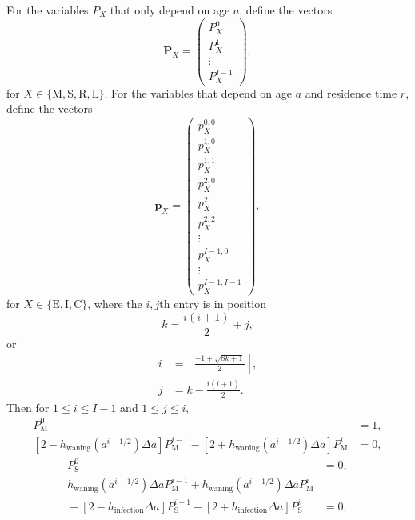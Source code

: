 \documentclass[12pt]{article}
\renewcommand{\vec}[1]{\mathbf{#1}}
\begin{document}
For the variables $P_X$ that only depend on age $a$,
define the vectors
\begin{equation}
  \vec{P}_X =
  \begin{pmatrix}
    P_X^0\\
    P_X^1\\
    \vdots\\
    P_X^{I - 1}
  \end{pmatrix},
\end{equation}
for $X \in \{\mathrm{M}, \mathrm{S}, \mathrm{R}, \mathrm{L}\}$.
For the variables that depend on age $a$ and residence time $r$,
define the vectors
\begin{equation}
  \vec{p}_X =
  \begin{pmatrix}
    p_X^{0, 0}\\
    p_X^{1, 0}\\
    p_X^{1, 1}\\
    p_X^{2, 0}\\
    p_X^{2, 1}\\
    p_X^{2, 2}\\
    \vdots\\
    p_X^{I - 1, 0}\\
    \vdots\\
    p_X^{I - 1, I - 1}
  \end{pmatrix},
\end{equation}
for $X \in \{\mathrm{E}, \mathrm{I}, \mathrm{C}\}$,
where the $i, j$th entry is in position
\begin{equation}
  k = \frac{i (i + 1)}{2} + j,
\end{equation}
or
\begin{equation}
  \begin{split}
    i &= \left\lfloor\frac{- 1 + \sqrt{8 k + 1}}{2}\right\rfloor,
    \\
    j &= k - \frac{i (i + 1)}{2}.
  \end{split}
\end{equation}
Then for $1 \leq i \leq I - 1$ and $1 \leq j \leq i$,
\begin{equation}
  \begin{split}
    P_{\mathrm{M}}^0 &= 1,
    \\
    \left[2 - h_{\text{waning}}(a^{i - 1 / 2}) \Delta a\right]
    P_{\mathrm{M}}^{i - 1}
    - \left[2 + h_{\text{waning}}(a^{i - 1 / 2}) \Delta a\right]
    P_{\mathrm{M}}^i
    &= 0,
  \end{split}
\end{equation}
\begin{equation}
  \begin{split}
    P_{\mathrm{S}}^0 &= 0,
    \\
    h_{\text{waning}}(a^{i - 1 / 2}) \Delta a P_{\mathrm{M}}^{i - 1}
    + h_{\text{waning}}(a^{i - 1 / 2}) \Delta a P_{\mathrm{M}}^i
    \\ {}
    + \left[2 - h_{\text{infection}} \Delta a\right]
    P_{\mathrm{S}}^{i - 1}
    - \left[2 + h_{\text{infection}} \Delta a\right]
    P_{\mathrm{S}}^i
    &= 0,
  \end{split}
\end{equation}
\end{document}
